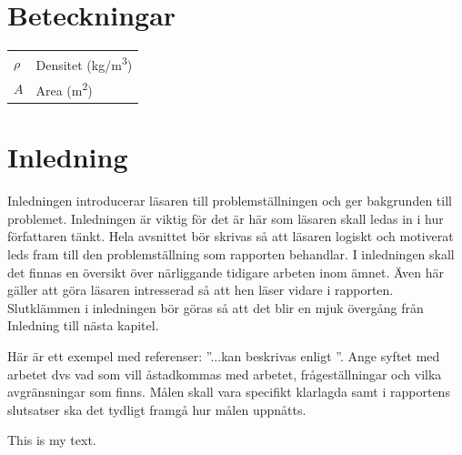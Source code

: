 \documentclass[a4paper]{article}
\begin{document}
\newpage
\section*{Beteckningar}
\begin{table}[h]
\begin{tabular}{l l}
$\rho$ & Densitet (\si{kg/m^3}) \\
$A$ & Area (\si{m^2})
\end{tabular}
\end{table}


\newpage
{} 
\setcounter{page}{1}
\section{Inledning}
Inledningen introducerar läsaren till problemställningen och ger bakgrunden till problemet. Inledningen är viktig för det är här som läsaren skall ledas in i hur författaren tänkt. Hela avsnittet bör skrivas så att läsaren logiskt och motiverat leds fram till den problemställning som rapporten behandlar. I inledningen skall det finnas en översikt över närliggande tidigare arbeten inom ämnet. Även här gäller att göra läsaren intresserad så att hen läser vidare i rapporten. Slutklämmen i inledningen bör göras så att det blir en mjuk övergång från Inledning till nästa kapitel.

Här är ett exempel med referenser: ''...kan beskrivas enligt \cite{Sterte2001}''.
Ange syftet med arbetet dvs vad som vill åstadkommas med arbetet, frågeställningar och vilka avgränsningar som finns. Målen skall vara specifikt klarlagda samt i rapportens slutsatser ska det tydligt framgå hur målen uppnåtts.


This is my text.
\end{document}
